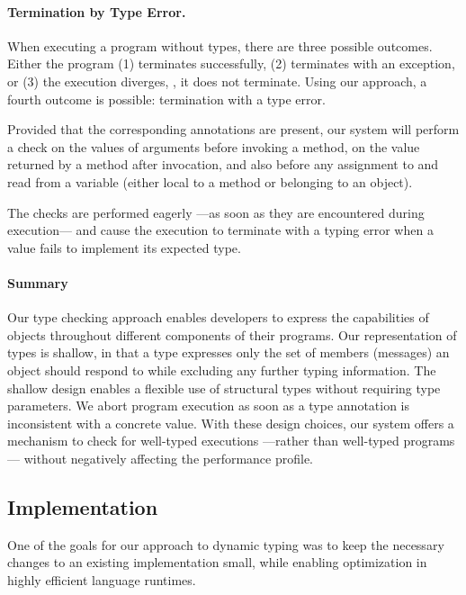 \paragraph{Termination by Type Error.}
\label{sec:term-type-error}

When executing a program without types, there are three possible outcomes.
Either the program (1) terminates successfully,
(2) terminates with an exception, or 
(3) the execution diverges, \ie, it does not terminate.
Using our approach, a
fourth outcome is possible: termination with a type error.

Provided that the corresponding annotations are present, 
our system will perform a check
on the values of arguments before invoking a method, 
on the value returned by a method after invocation, and
also before any assignment to and read from a variable 
(either local to a method or belonging to an object). 

The checks are performed eagerly%
---as soon as they are encountered during execution---%
and cause the execution to terminate with a typing error 
when a value fails to implement its expected type.

\paragraph{Summary}
Our type checking approach enables developers to express
the capabilities of objects throughout different components of 
their programs.
Our representation of types is shallow,
in that a type expresses only the set of members (messages) an object
should respond to while excluding any further typing information. 
The shallow design enables a flexible use of structural types without
requiring type parameters.
We abort program execution as soon as
a type annotation is inconsistent with a concrete value. 
With these design choices, our system offers a
mechanism to check for well-typed executions%
---rather than well-typed programs---%
without negatively affecting the performance profile.

\subsection{Implementation} 
\label{ssec:implementation} 

One of the goals for our approach to dynamic typing was to keep
the necessary changes to an existing implementation small,
while enabling optimization in highly efficient language runtimes.

